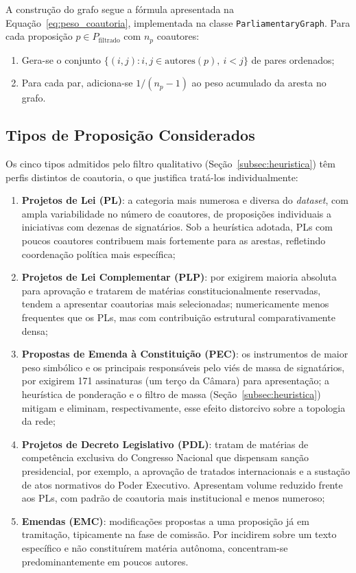 \documentclass[
      12pt,
      a4paper,
      openright,
      oneside,
      chapter=TITLE,
      section=TITLE,
      english,
      french,
      spanish,
      brazilian
    ]{abntex2}
\begin{document}
    A construção do grafo segue a fórmula apresentada na Equação~\ref{eq:peso_coautoria}, implementada na classe \texttt{ParliamentaryGraph}. Para cada proposição $p \in P_{\text{filtrado}}$ com $n_p$ coautores:
    
    \begin{enumerate}
        \item Gera-se o conjunto $\{(i, j) : i, j \in \text{autores}(p),\ i < j\}$ de pares ordenados;
        \item Para cada par, adiciona-se $1/(n_p - 1)$ ao peso acumulado da aresta no grafo.
    \end{enumerate}
    
    \subsection{Tipos de Proposição Considerados}

    Os cinco tipos admitidos pelo filtro qualitativo (Seção~\ref{subsec:heuristica}) têm perfis distintos de coautoria, o que justifica tratá-los individualmente:

    \begin{enumerate}[label=\alph*)]
        \item \textbf{Projetos de Lei (PL)}: a categoria mais numerosa e diversa do \textit{dataset}, com ampla variabilidade no número de coautores, de proposições individuais a iniciativas com dezenas de signatários. Sob a heurística adotada, PLs com poucos coautores contribuem mais fortemente para as arestas, refletindo coordenação política mais específica;
        \item \textbf{Projetos de Lei Complementar (PLP)}: por exigirem maioria absoluta para aprovação e tratarem de matérias constitucionalmente reservadas, tendem a apresentar coautorias mais selecionadas; numericamente menos frequentes que os PLs, mas com contribuição estrutural comparativamente densa;
        \item \textbf{Propostas de Emenda à Constituição (PEC)}: os instrumentos de maior peso simbólico e os principais responsáveis pelo viés de massa de signatários, por exigirem 171 assinaturas (um terço da Câmara) para apresentação; a heurística de ponderação e o filtro de massa (Seção~\ref{subsec:heuristica}) mitigam e eliminam, respectivamente, esse efeito distorcivo sobre a topologia da rede;
        \item \textbf{Projetos de Decreto Legislativo (PDL)}: tratam de matérias de competência exclusiva do Congresso Nacional que dispensam sanção presidencial, por exemplo, a aprovação de tratados internacionais e a sustação de atos normativos do Poder Executivo. Apresentam volume reduzido frente aos PLs, com padrão de coautoria mais institucional e menos numeroso;
        \item \textbf{Emendas (EMC)}: modificações propostas a uma proposição já em tramitação, tipicamente na fase de comissão. Por incidirem sobre um texto específico e não constituírem matéria autônoma, concentram-se predominantemente em poucos autores.
    \end{enumerate}
    
\end{document}
